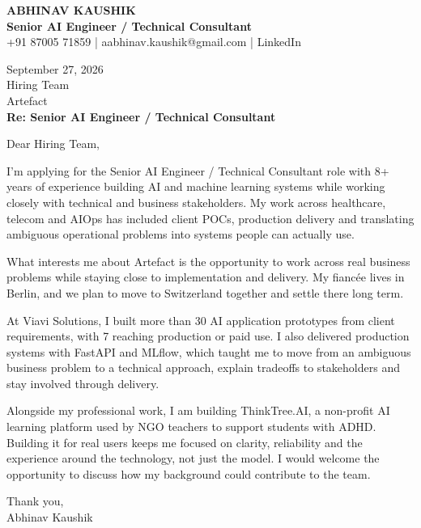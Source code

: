 \documentclass[10pt,a4paper]{article}
\begin{document}
\begin{center}
{\Large\bfseries ABHINAV KAUSHIK}\\[2pt]
{\bfseries Senior AI Engineer / Technical Consultant}\\[2pt]
+91 87005 71859 \quad | \quad aabhinav.kaushik@gmail.com \quad | \quad LinkedIn
\end{center}
\vspace{8pt}
September 27, 2026\\[6pt]
Hiring Team\\
Artefact\\[4pt]
\textbf{Re: Senior AI Engineer / Technical Consultant}

Dear Hiring Team,

I’m applying for the Senior AI Engineer / Technical Consultant role with 8+ years of experience building AI and machine learning systems while working closely with technical and business stakeholders. My work across healthcare, telecom and AIOps has included client POCs, production delivery and translating ambiguous operational problems into systems people can actually use.

What interests me about Artefact is the opportunity to work across real business problems while staying close to implementation and delivery. My fiancée lives in Berlin, and we plan to move to Switzerland together and settle there long term.

At Viavi Solutions, I built more than 30 AI application prototypes from client requirements, with 7 reaching production or paid use. I also delivered production systems with FastAPI and MLflow, which taught me to move from an ambiguous business problem to a technical approach, explain tradeoffs to stakeholders and stay involved through delivery.

Alongside my professional work, I am building ThinkTree.AI, a non-profit AI learning platform used by NGO teachers to support students with ADHD. Building it for real users keeps me focused on clarity, reliability and the experience around the technology, not just the model. I would welcome the opportunity to discuss how my background could contribute to the team.

Thank you,\\
Abhinav Kaushik
\end{document}
